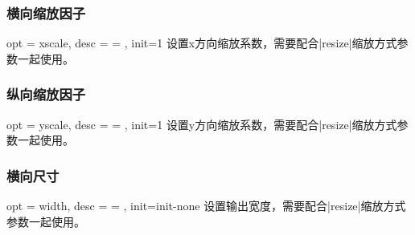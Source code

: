 \documentclass[full]{l3doc}
\begin{document}
\begin{documentation}
\bigskip

\subsubsection{横向缩放因子}

\begin{option}{ opt = xscale, desc = {= }, init=1 }
  设置x方向缩放系数，需要配合|resize|缩放方式参数一起使用。
\end{option}

\begin{SideBySideExample}[frame=single,numbers=left,
                xrightmargin=.48\linewidth,gobble=2]
  \centering
  \cchessboard[resize/type=real,
              resize/xscale=0.5]
\end{SideBySideExample}


\bigskip

\subsubsection{纵向缩放因子}

\begin{option}{ opt = yscale, desc = {= }, init=1 }
  设置y方向缩放系数，需要配合|resize|缩放方式参数一起使用。
\end{option}

\begin{SideBySideExample}[frame=single,numbers=left,
                xrightmargin=.70\linewidth,gobble=2]
  \centering
  \cchessboard[%
    resize/type=real,
    resize/yscale=0.5]
\end{SideBySideExample}

\bigskip

\subsubsection{横向尺寸}

\begin{option}{ opt = width, desc = {= }, init=init-none }
  设置输出宽度，需要配合|resize|缩放方式参数一起使用。
\end{option}

\begin{SideBySideExample}[frame=single,numbers=left,
                xrightmargin=.65\linewidth,gobble=2]
  \centering
  \cchessboard[%
    resize/type=real,
    resize/width=7cm]
\end{SideBySideExample}


\end{documentation}
\end{document}
